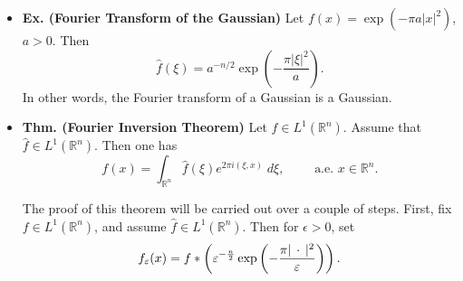 \documentclass{article}
\begin{document}
\begin{itemize}
	{\color{blue}
		\begin{enumerate}[itemsep =-2pt,label = (\arabic{*})]
			\item We will prove the case for $|\alpha| = 1$ since the higher cases follow by induction. We compute the following: 
			\begin{align}
				\begin{split}
					\abs{\frac{\hat{f}(\xi + he_{j}) - \hat{f}(\xi)}{h}} &= \abs{\int_{\mathbb{R}^{n}}f(x) \cdot \frac{e^{-2\pi i (\xi + he_{j}, x)} - e^{-2\pi i (\xi, x)}}{h}\; dx} \\
					&= \abs{\int_{\mathbb{R}^{n}}f(x)e^{-2\pi i (\xi, x)} \cdot \left(\frac{e^{-2\pi i (he_{j},x)} - 1}{h}\right)\;dx} \\
					&\leq \int_{\mathbb{R}^{n}}\abs{f(x)} \abs{\left(\frac{e^{-2\pi i (he_{j},x)} - 1}{h}\right)}\;dx
				\end{split}
			\end{align}
			Since 
			\begin{equation}
				\abs{\left(\frac{e^{-2\pi i (he_{j},x)} - 1}{h}\right)} \leq 2\pi |x_{j}|, 
			\end{equation}
			applying the Dominated Convergence Theorem concludes the proof. 
			\item \textcolor{red}{[!! Complete Later !!]}
		\end{enumerate}	
	}
	
	\item \textbf{Ex. (Fourier Transform of the Gaussian)} Let $f(x) =\exp(-\pi a|x|^{2})$, $a > 0$. Then 
	\begin{equation}
		\hat{f}(\xi) = a^{-n/2}\exp\left(-\frac{\pi |\xi|^{2}}{a}\right).
	\end{equation}
	In other words, the Fourier transform of a Gaussian is a Gaussian. 
	
	\item \textbf{Thm. (Fourier Inversion Theorem)} Let $f \in L^{1}(\mathbb{R}^{n})$. Assume that $\hat{f} \in L^{1}(\mathbb{R}^{n})$. Then one has
	\begin{equation}
		f(x) = \int_{\mathbb{R}^{n}}\hat{f}(\xi)e^{2\pi i (\xi, x)}\;d\xi, \qquad \text{ a.e. $x \in \mathbb{R}^{n}$}. 
	\end{equation}
	
	{\color{blue} 
		The proof of this theorem will be carried out over a couple of steps. First, fix $f \in L^{1}(\mathbb{R}^{n})$, and assume $\hat{f} \in L^{1}(\mathbb{R}^{n})$. Then for $\epsilon > 0$, set 
		\begin{equation}
			f_{\varepsilon}(x) = f \ast \left(\varepsilon^{-\frac{n}{2}}\exp\left(-\frac{\pi |\hspace{2pt}\cdot\hspace{2pt}|^{2}}{\varepsilon}\right)\right). 
		\end{equation}	
		
}
\end{itemize}
\end{document}
